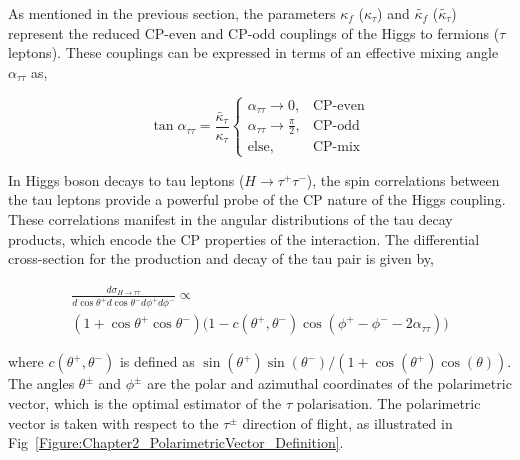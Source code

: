 As mentioned in the previous section, the parameters $\kappa_f$ ($\kappa_\tau$) and $\tilde{\kappa_f}$ ($\tilde{\kappa_\tau}$) represent the reduced CP-even and CP-odd couplings of the Higgs to fermions ($\tau$ leptons). These couplings can be expressed in terms of an effective mixing angle $\alpha_{\tau\tau}$ as,

\begin{equation}
\tan \alpha_{\tau\tau} = \frac{\bar{\kappa}_\tau}{\kappa_\tau} 
\begin{cases}
    \alpha_{\tau\tau} \to 0, & \text{CP-even} \\
    \alpha_{\tau\tau} \to \frac{\pi}{2}, & \text{CP-odd} \\
    \text{else}, & \text{CP-mix}
\end{cases}
\end{equation}

In Higgs boson decays to tau leptons (\(H \to \tau^+ \tau^-\)), the spin correlations between the tau leptons provide a powerful probe of the CP nature of the Higgs coupling. These correlations manifest in the angular distributions of the tau decay products, which encode the CP properties of the interaction. The differential cross-section for the production and decay of the tau pair is given by,

\begin{equation}
\begin{array}{c}
{\displaystyle
\frac{d\sigma_{H\to\tau\tau}}{d\cos\theta^+ d\cos\theta^- d\phi^+ d\phi^-} \propto
} \\[10pt]
{\displaystyle
(1 + \cos\theta^+ \cos\theta^-) \Big(1 - c(\theta^+, \theta^-) \cos(\phi^+ - \phi^- - 2\alpha_{\tau\tau})\Big)
}
\end{array}
\label{Equation:Chapter2_TauDifferentialXS}
\end{equation}

where $c(\theta^+, \theta^-)$ is defined as $\sin(\theta^+)\sin(\theta^-)/(1+\cos(\theta^+)\cos(\theta))$. The angles $\theta^\pm$ and $\phi^\pm$ are the polar and azimuthal coordinates of the polarimetric vector, which is the optimal estimator of the $\tau$ polarisation. The polarimetric vector is taken with respect to the $\tau^\pm$ direction of flight, as illustrated in Fig~\ref{Figure:Chapter2_PolarimetricVector_Definition}.

